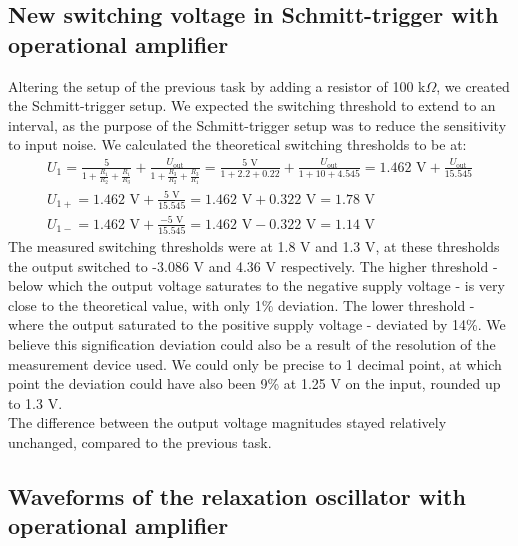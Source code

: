 \documentclass[12pt]{article}
\begin{document}
\subsection{New switching voltage in Schmitt-trigger with operational amplifier}
Altering the setup of the previous task by adding a resistor of 100 k$\Omega$, 
we created the Schmitt-trigger setup. We expected the switching threshold to extend 
to an interval, as the purpose of the Schmitt-trigger setup was to reduce the sensitivity 
to input noise. We calculated the theoretical switching thresholds to be at:
\begin{gather*}
    U_1 = \frac{5}{1 + \frac{R_1}{R_2} + \frac{R_1}{R_3}} + \frac{U_{\text{out}}}{1 + \frac{R_3}{R_2} + \frac{R_3}{R_1}} = \frac{5\text{ V}}{1 + 2.2 + 0.22} + \frac{U_{\text{out}}}{1 + 10 + 4.545} = 1.462\text{ V} + \frac{U_{\text{out}}}{15.545}\\[1.2em]
    U_{1+} = 1.462\text{ V} + \frac{5\text{ V}}{15.545} = 1.462\text{ V} + 0.322\text{ V} = 1.78\text{ V}\\[1.2em]
    U_{1-} = 1.462\text{ V} + \frac{-5\text{ V}}{15.545} = 1.462\text{ V} - 0.322\text{ V} = 1.14\text{ V}
\end{gather*}
The measured switching thresholds were at 1.8 V and 1.3 V, 
at these thresholds the output switched to -3.086 V and 4.36 V respectively. 
The higher threshold - below which the output voltage saturates to the negative supply 
voltage - is very close to the theoretical value, with only 1\% deviation. The lower 
threshold - where the output saturated to the positive supply voltage - deviated by 14\%. 
We believe this signification deviation could also be a result of the resolution of 
the measurement device used. We could only be precise to 1 decimal point, at which point 
the deviation could have also been 9\% at 1.25 V on the input, rounded up to 1.3 V.\\
The difference between the output voltage magnitudes stayed relatively unchanged, compared 
to the previous task.

\subsection{Waveforms of the relaxation oscillator with operational amplifier}
\end{document}
